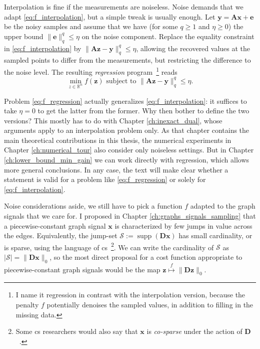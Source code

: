 Interpolation is fine if the measurements are noiseless. Noise demands that we adapt \eqref{eq:f_interpolation}, but a simple tweak is usually enough. Let $\mathbf{y} = \mathbf{Ax} + \mathbf{e}$ be the noisy samples and assume that we have (for some $q \geq 1$ and $\eta \geq 0$) the upper bound $\| \mathbf{e} \|_q^q \leq \eta$ on the noise component. Replace the equality constraint in \eqref{eq:f_interpolation} by $\| \mathbf{Az - y} \|_q^q \leq \eta$, allowing the recovered values at the sampled points to differ from the measurements, but restricting the difference to the noise level. The resulting \emph{regression} program~\footnote{I name it regression in contrast with the interpolation version, because the penalty $f$ potentially denoises the sampled values, in addition to filling in the missing data.} reads
\begin{equation}
    \underset{z \in \mathbb{R}^{n}}{\min} f(\mathbf{z}) \text{ subject to } \| \mathbf{Az - y} \|_q^q \leq \eta. \tag{P$f$-$\eta$} \label{eq:f_regression}
\end{equation}

Problem \eqref{eq:f_regression} actually generalizes \eqref{eq:f_interpolation}: it suffices to take $\eta = 0$ to get the latter from the former. Why then bother to define the two versions? This mostly has to do with Chapter \ref{ch:inexact_dual}, whose arguments apply to an interpolation problem only. As that chapter contains the main theoretical contributions in this thesis, the numerical experiments in Chapter \ref{ch:numerical_tour} also consider only noiseless settings. But in Chapter \ref{ch:lower_bound_min_gain} we can work directly with regression, which allows more general conclusions. In any case, the text will make clear whether a statement is valid for a problem like \eqref{eq:f_regression} or solely for \eqref{eq:f_interpolation}.

Noise considerations aside, we still have to pick a function $f$ adapted to the graph signals that we care for. I proposed in Chapter \ref{ch:graphs_signals_sampling} that a piecewise-constant graph signal $\mathbf{x}$ is characterized by few jumps in value across the edges. Equivalently, the jump-set $\mathcal{S} := \operatorname{supp}\left ( \mathbf{Dx} \right )$ has small cardinality, or is sparse, using the language of \acrfull{cs}~\footnote{Some \acrshort{cs} researchers would also say that $\mathbf{x}$ is \emph{co-sparse} under the action of $\mathbf{D}$~\cite{nam2013}.}. We can write the cardinality of $\mathcal{S}$ as $|\mathcal{S}| = \|\mathbf{Dx}\|_0$, so the most direct proposal for a cost function appropriate to piecewise-constant graph signals would be the map $\mathbf{z} \overset{f}{\mapsto} \|\mathbf{Dz}\|_0$.

